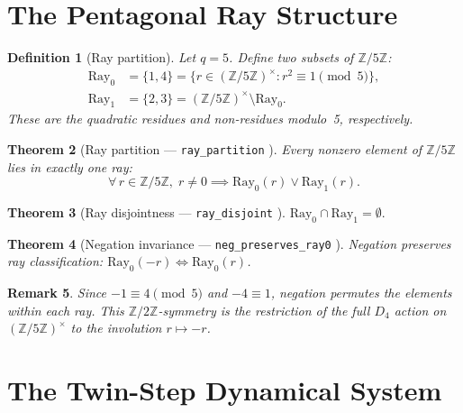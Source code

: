 \documentclass[11pt,a4paper]{article}
\newtheorem{theorem}{Theorem}[section]
\newtheorem{definition}[theorem]{Definition}
\newtheorem{remark}[theorem]{Remark}
\newcommand{\Z}{\mathbb{Z}}
\newcommand{\lean}[1]{\texttt{\small #1}}
\newcommand{\verified}{\textcolor{green!60!black}{\checkmark}}
\begin{document}
\section{The Pentagonal Ray Structure}\label{sec:rays}

\begin{definition}[Ray partition]\label{def:rays}
  Let $q = 5$. Define two subsets of $\Z/5\Z$:
  \begin{align}
    \mathrm{Ray}_0 &= \{1, 4\} = \{r \in (\Z/5\Z)^\times : r^2 \equiv 1 \pmod{5}\}, \\
    \mathrm{Ray}_1 &= \{2, 3\} = (\Z/5\Z)^\times \setminus \mathrm{Ray}_0.
  \end{align}
  These are the quadratic residues and non-residues modulo~5, respectively.
\end{definition}

\begin{theorem}[Ray partition --- \lean{ray\_partition} \verified]\label{thm:partition}
  Every nonzero element of $\Z/5\Z$ lies in exactly one ray:
  \[
    \forall\, r \in \Z/5\Z,\; r \neq 0 \implies \mathrm{Ray}_0(r) \lor \mathrm{Ray}_1(r).
  \]
\end{theorem}

\begin{theorem}[Ray disjointness --- \lean{ray\_disjoint} \verified]\label{thm:disjoint}
  $\mathrm{Ray}_0 \cap \mathrm{Ray}_1 = \emptyset.$
\end{theorem}

\begin{theorem}[Negation invariance --- \lean{neg\_preserves\_ray0} \verified]\label{thm:neg}
  Negation preserves ray classification:
  $\mathrm{Ray}_0(-r) \iff \mathrm{Ray}_0(r)$.
\end{theorem}

\begin{remark}
  Since $-1 \equiv 4 \pmod{5}$ and $-4 \equiv 1$, negation permutes the
  elements within each ray. This $\Z/2\Z$-symmetry is the restriction of the
  full $D_4$ action on $(\Z/5\Z)^\times$ to the involution $r \mapsto -r$.
\end{remark}

\section{The Twin-Step Dynamical System}\label{sec:twin}
\end{document}
